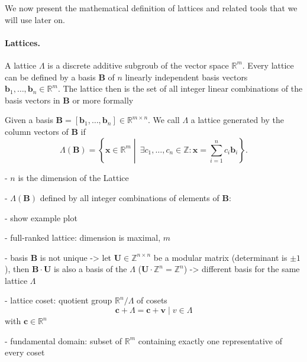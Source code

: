 \documentclass[
  a4paper,  %
  twoside,  %
  bibliography=totoc,
  headsepline,
  cleardoublepage=empty,
  parskip=half,
  draft=false
]{scrbook}
\begin{document}
We now present the mathematical definition of lattices and related tools that we will use later on.

\paragraph{Lattices.} A lattice $\Lambda$ is a discrete additive subgroub of the vector space $\mathbb{R}^m$. Every lattice can be defined by a basis $\mathbf{B}$ of $n$ linearly independent basis vectors $\mathbf{b}_1, \ldots, \mathbf{b}_n \in \mathbb{R}^m$. The lattice then is the set of all integer linear combinations of the basis vectors in $\mathbf{B}$ or more formally

\begin{definition}[Lattice]
  Given a basis $\mathbf{B} = \left[\mathbf{b}_1, \ldots, \mathbf{b}_n\right] \in \mathbb{R}^{m\times n}$. We call $\Lambda$ a lattice generated by the column vectors of $\mathbf{B}$ if
  \begin{equation}
    \Lambda(\mathbf{B}) = \left\{ \mathbf{x} \in \mathbb{R}^m \middle\vert\ \exists c_1, \ldots, c_n \in \mathbb{Z} : \mathbf{x} = \sum_{i=1}^n c_i \mathbf{b}_i \right\}.
  \end{equation}
\end{definition}



- $n$ is the dimension of the Lattice

- $\Lambda(\mathbf{B})$ defined by all integer combinations of elements of $\mathbf{B}$:

- show example plot %

- full-ranked lattice: dimension is maximal, $m$

- basis $\mathbf{B}$ is not unique -> let $\mathbf{U}\in \mathbb{Z}^{n\times n}$ be a modular matrix (determinant is $\pm1$), then $\mathbf{B}\cdot \mathbf{U}$ is also a basis of the $\Lambda$ ($\mathbf{U} \cdot \mathbb{Z}^{n} = \mathbb{Z}^{n}$) -> different basis for the same lattice $\Lambda$

- lattice coset:
quotient group $\mathbb{R}^n/\Lambda$ of cosets
\begin{equation*}
  \mathbf{c} + \Lambda = {\mathbf{c} + \mathbf{v} \mid v \in \Lambda}
\end{equation*}
with $\mathbf{c} \in \mathbb{R}^n$ %

- fundamental domain: subset of $\mathbb{R}^m$ containing exactly one representative of every coset
\end{document}
